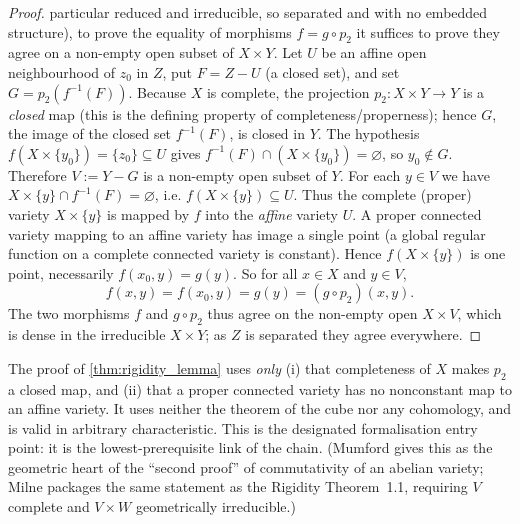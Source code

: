 \begin{proof}
  particular reduced and irreducible, so separated and with no embedded structure), to prove
  the equality of morphisms \(f = g \circ p_2\) it suffices to prove they agree on a non-empty
  open subset of \(X \times Y\).
  Let \(U\) be an affine open neighbourhood of \(z_0\) in \(Z\), put \(F = Z - U\) (a closed set),
  and set \(G = p_2(f^{-1}(F))\). Because \(X\) is complete, the projection
  \(p_2 \colon X \times Y \to Y\) is a \emph{closed} map (this is the defining property of
  completeness/properness); hence \(G\), the image of the closed set \(f^{-1}(F)\), is closed in
  \(Y\). The hypothesis \(f(X \times \{y_0\}) = \{z_0\} \subseteq U\) gives
  \(f^{-1}(F) \cap (X \times \{y_0\}) = \varnothing\), so \(y_0 \notin G\). Therefore
  \(V := Y - G\) is a non-empty open subset of \(Y\).
  For each \(y \in V\) we have \(X \times \{y\} \cap f^{-1}(F) = \varnothing\), i.e.
  \(f(X \times \{y\}) \subseteq U\). Thus the complete (proper) variety \(X \times \{y\}\) is
  mapped by \(f\) into the \emph{affine} variety \(U\). A proper connected variety mapping to an
  affine variety has image a single point (a global regular function on a complete connected
  variety is constant). Hence \(f(X \times \{y\})\) is one point, necessarily
  \(f(x_0, y) = g(y)\). So for all \(x \in X\) and \(y \in V\),
  \[ f(x, y) = f(x_0, y) = g(y) = (g \circ p_2)(x, y). \]
  The two morphisms \(f\) and \(g \circ p_2\) thus agree on the non-empty open
  \(X \times V\), which is dense in the irreducible \(X \times Y\); as \(Z\) is separated they
  agree everywhere. \qedhere
\end{proof}
\begin{remark}
  \label{rmk:rigidity_lemma_cube_free}
  The proof of \cref{thm:rigidity_lemma} uses \emph{only} (i) that completeness of \(X\) makes
  \(p_2\) a closed map, and (ii) that a proper connected variety has no nonconstant map to an
  affine variety. It uses neither the theorem of the cube nor any cohomology, and is valid in
  arbitrary characteristic. This is the designated formalisation entry point: it is the
  lowest-prerequisite link of the chain. (Mumford gives this as the geometric heart of the
  ``second proof'' of commutativity of an abelian variety; Milne packages the same statement
  as the Rigidity Theorem~1.1, requiring \(V\) complete and \(V \times W\) geometrically
  irreducible.)
\end{remark}
